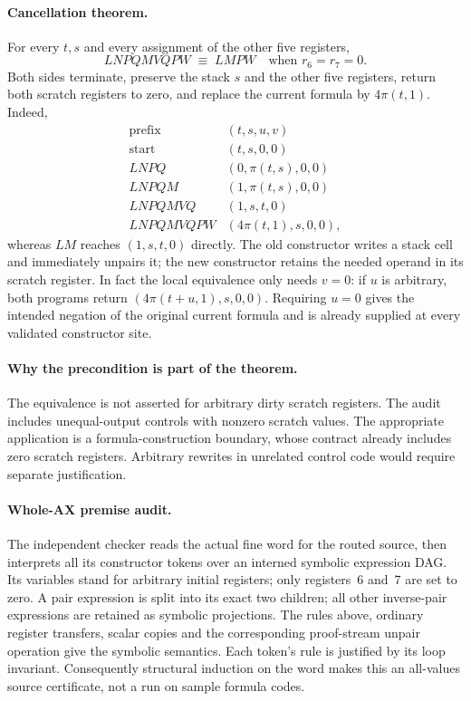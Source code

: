 \paragraph{Cancellation theorem.}
For every $t,s$ and every assignment of the other five registers,
\[
 \boxed{\quad LNPQMVQPW\;\equiv\;LMPW
       \quad\text{when }r_6=r_7=0.\quad}
\]
Both sides terminate, preserve the stack $s$ and the other five registers,
return both scratch registers to zero, and replace the current formula by
$4\pi(t,1)$.  Indeed,
\[
\begin{array}{c|c}
\text{prefix}&(t,s,u,v)\\\hline
\text{start}&(t,s,0,0)\\
LNPQ&(0,\pi(t,s),0,0)\\
LNPQM&(1,\pi(t,s),0,0)\\
LNPQMVQ&(1,s,t,0)\\
LNPQMVQPW&(4\pi(t,1),s,0,0),
\end{array}
\]
whereas $LM$ reaches $(1,s,t,0)$ directly.  The old constructor writes a
stack cell and immediately unpairs it; the new constructor retains the
needed operand in its scratch register.
In fact the local equivalence only needs $v=0$: if $u$ is arbitrary, both
programs return $(4\pi(t+u,1),s,0,0)$.  Requiring $u=0$ gives the intended
negation of the original current formula and is already supplied at every
validated constructor site.

\paragraph{Why the precondition is part of the theorem.}
The equivalence is not asserted for arbitrary dirty scratch registers.
The audit includes unequal-output controls with nonzero scratch values.
The appropriate application is a formula-construction boundary, whose
contract already includes zero scratch registers.  Arbitrary rewrites in
unrelated control code would require separate justification.

\paragraph{Whole-AX premise audit.}
The independent checker reads the actual fine word for the routed source,
then interprets all its constructor tokens over an interned symbolic
expression DAG.  Its variables stand for arbitrary initial registers;
only registers~6 and~7 are set to zero.  A pair expression is split into its
exact two children; all other inverse-pair expressions are retained as
symbolic projections.  The rules above, ordinary register transfers, scalar
copies and the corresponding proof-stream unpair operation give the
symbolic semantics.  Each token's rule is justified by its loop invariant.
Consequently structural induction on the word makes this an all-values
source certificate, not a run on sample formula codes.

